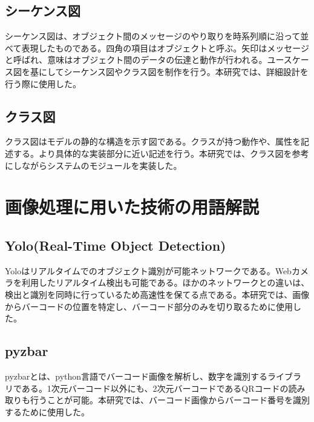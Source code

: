 \subsection*{シーケンス図}
シーケンス図は、オブジェクト間のメッセージのやり取りを時系列順に沿って並べて表現したものである。四角の項目はオブジェクトと呼ぶ。矢印はメッセージと呼ばれ、意味はオブジェクト間のデータの伝達と動作が行われる。ユースケース図を基にしてシーケンス図やクラス図を制作を行う。本研究では、詳細設計を行う際に使用した。

\subsection*{クラス図}
クラス図はモデルの静的な構造を示す図である。クラスが持つ動作や、属性を記述する。より具体的な実装部分に近い記述を行う。本研究では、クラス図を参考にしながらシステムのモジュールを実装した。

\section{画像処理に用いた技術の用語解説}

\subsection*{Yolo(Real-Time Object Detection)}
Yoloはリアルタイムでのオブジェクト識別が可能ネットワークである。Webカメラを利用したリアルタイム検出も可能である。ほかのネットワークとの違いは、検出と識別を同時に行っているため高速性を保てる点である。本研究では、画像からバーコードの位置を特定し、バーコード部分のみを切り取るために使用した\cite{yolo}。


\subsection*{pyzbar}
pyzbarとは、python言語でバーコード画像を解析し、数字を識別するライブラリである\cite{pyzbar}。1次元バーコード以外にも、2次元バーコードであるQRコードの読み取りも行うことが可能。本研究では、バーコード画像からバーコード番号を識別するために使用した。